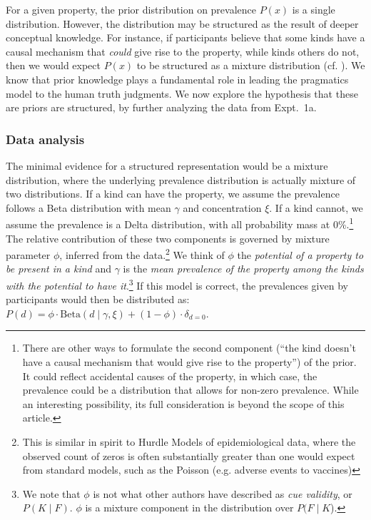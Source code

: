 \documentclass[12pt,letterpaper]{article}
\begin{document}
For a given property,  the prior distribution on prevalence $P(x)$ is a single distribution.
However, the distribution may be structured as the result of deeper conceptual knowledge. 
For instance, if participants believe that some kinds have a causal mechanism that \emph{could} give rise to the property, while kinds others do not, then we would expect $P(x)$ to be structured as a mixture distribution (cf. ).
We know that prior knowledge plays a fundamental role in leading the pragmatics model to the human truth judgments. 
We now explore the hypothesis that these are priors are structured, by further analyzing the data from Expt.~1a.

\subsubsection*{Data analysis}

The minimal evidence for a structured representation would be a mixture distribution, where the underlying prevalence distribution is actually mixture of two distributions. 
If a kind can have the property, we assume the prevalence follows a Beta distribution with mean $\gamma$ and concentration $\xi$. 
If a kind cannot, we assume the prevalence is a Delta distribution, with all probability mass at 0\%.\footnote{There are other ways to formulate the second component (``the kind doesn't have a causal mechanism that would give rise to  the property'') of the prior. 
It could reflect accidental causes of the property, in which case, the prevalence could be a distribution that allows for non-zero prevalence. 
While an interesting possibility, its full consideration is beyond the scope of this article.
}
The relative contribution of these two components is governed by mixture parameter $\phi$, inferred from the data.\footnote{This is similar in spirit to Hurdle Models of epidemiological data, where the observed count of zeros is often substantially greater than one would expect from standard models, such as the Poisson (e.g. adverse events to vaccines)\cite{hurdleModels}}
We think of $\phi$ the \emph{potential of a property to be present in a kind} and $\gamma$ is the \emph{mean prevalence of the property among the kinds with the potential to have it}.\footnote{We note that $\phi$ is not what other authors have described as \emph{cue validity}, or $P(K \mid F)$. 
$\phi$ is a mixture component in the distribution over $P(F\mid K$).
}
If this model is correct, the prevalences given by participants would then be distributed as: $P(d) = \phi \cdot \text{Beta}(d \mid \gamma,\xi)+ (1 - \phi) \cdot \delta_{d=0} $. 
\end{document}
